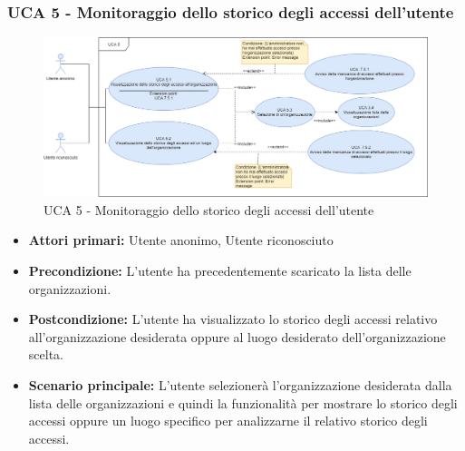 \subsubsection{UCA 5 - Monitoraggio dello storico degli accessi dell'utente}
\begin{figure}[h]
	\centering	
	\includegraphics[scale=0.4, left]{sezioni/UseCase/Immagini/UCA5.png}
	\caption{UCA 5 - Monitoraggio dello storico degli accessi dell'utente}
\end{figure}

\begin{itemize}
    \item \textbf{Attori primari:} Utente anonimo, Utente riconosciuto
    \item \textbf{Precondizione:} L'utente ha precedentemente scaricato la lista delle organizzazioni.
    \item \textbf{Postcondizione:} L'utente ha visualizzato lo storico degli accessi relativo all'organizzazione desiderata oppure al luogo desiderato dell'organizzazione scelta.
    \item \textbf{Scenario principale:} L'utente selezionerà l'organizzazione desiderata dalla lista delle organizzazioni e quindi la funzionalità per mostrare lo storico degli accessi oppure un luogo specifico per analizzarne il relativo storico degli accessi.
\end{itemize}

